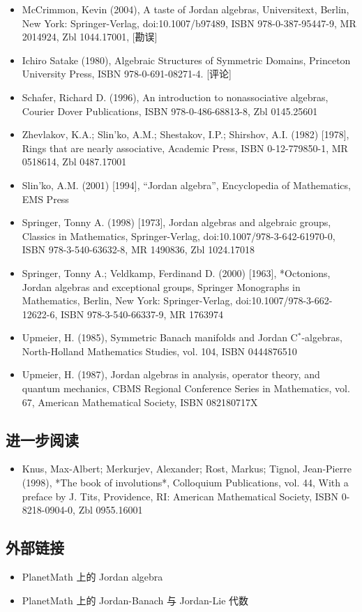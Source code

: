 \begin{itemize}
\item McCrimmon, Kevin (2004), A taste of Jordan algebras, Universitext, Berlin, New York: Springer-Verlag, doi:10.1007/b97489, ISBN 978-0-387-95447-9, MR 2014924, Zbl 1044.17001, [勘误]
\item Ichiro Satake (1980), Algebraic Structures of Symmetric Domains, Princeton University Press, ISBN 978-0-691-08271-4. [评论]
\item Schafer, Richard D. (1996), An introduction to nonassociative algebras, Courier Dover Publications, ISBN 978-0-486-68813-8, Zbl 0145.25601
\item Zhevlakov, K.A.; Slin'ko, A.M.; Shestakov, I.P.; Shirshov, A.I. (1982) [1978], Rings that are nearly associative, Academic Press, ISBN 0-12-779850-1, MR 0518614, Zbl 0487.17001
\item Slin'ko, A.M. (2001) [1994], “Jordan algebra”, Encyclopedia of Mathematics, EMS Press
\item Springer, Tonny A. (1998) [1973], Jordan algebras and algebraic groups, Classics in Mathematics, Springer-Verlag, doi:10.1007/978-3-642-61970-0, ISBN 978-3-540-63632-8, MR 1490836, Zbl 1024.17018
\item Springer, Tonny A.; Veldkamp, Ferdinand D. (2000) [1963], *Octonions, Jordan algebras and exceptional groups, Springer Monographs in Mathematics, Berlin, New York: Springer-Verlag, doi:10.1007/978-3-662-12622-6, ISBN 978-3-540-66337-9, MR 1763974
\item Upmeier, H. (1985), Symmetric Banach manifolds and Jordan C$^*$-algebras, North-Holland Mathematics Studies, vol. 104, ISBN 0444876510
\item Upmeier, H. (1987), Jordan algebras in analysis, operator theory, and quantum mechanics, CBMS Regional Conference Series in Mathematics, vol. 67, American Mathematical Society, ISBN 082180717X
\end{itemize}
\subsection{进一步阅读}
\begin{itemize}
\item Knus, Max-Albert; Merkurjev, Alexander; Rost, Markus; Tignol, Jean-Pierre (1998), *The book of involutions*, Colloquium Publications, vol. 44, With a preface by J. Tits, Providence, RI: American Mathematical Society, ISBN 0-8218-0904-0, Zbl 0955.16001
\end{itemize}
\subsection{外部链接}
\begin{itemize}
\item PlanetMath 上的 Jordan algebra
\item PlanetMath 上的 Jordan-Banach 与 Jordan-Lie 代数
\end{itemize}